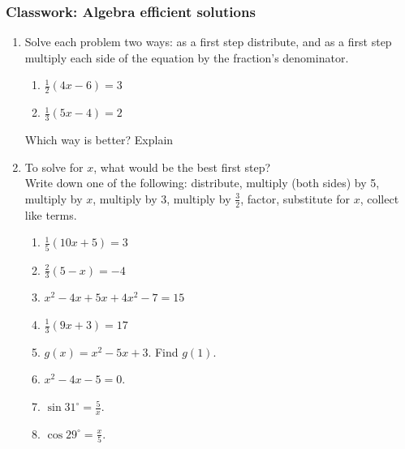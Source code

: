 \documentclass[12pt, twoside]{article}
\begin{document}
\begin{enumerate}
\end{enumerate}

\newpage

\subsubsection*{Classwork: Algebra efficient solutions}
\begin{enumerate}
  \item Solve each problem two ways: as a first step distribute, and as a first step multiply each side of the equation by the fraction's denominator. \vspace{0.5cm}
  \begin{multicols}{2}
    \raggedcolumns
    \begin{enumerate}
  \item   $\frac{1}{2}(4x-6)=3$ \vspace{2.5cm}
  \item   $\frac{1}{3}(5x-4)=2$ \vspace{2.5cm}
  \end{enumerate}

  \end{multicols}
  \vspace{13cm}
Which way is better? Explain
\newpage

\item To solve for $x$, what would be the best first step? \\[0.5cm]
Write down one of the following: distribute, multiply (both sides) by 5, multiply by $x$, multiply by 3, multiply by $\frac{3}{2}$, factor, substitute for $x$, collect like terms. \vspace{0.5cm}
\begin{multicols}{2}
  \raggedcolumns
  \begin{enumerate}
\item   $\frac{1}{5}(10x+5)=3$ \vspace{0.5cm}
\item   $\frac{2}{3}(5-x)=-4$ \vspace{0.5cm}
\item $x^2-4x+5x+4x^2-7=15$ \vspace{0.5cm}
\item $\frac{1}{3}(9x+3)=17$ \vspace{0.5cm}
\item $g(x)=x^2-5x+3$. Find $g(1)$. \vspace{0.5cm}
\item $x^2-4x-5=0$. \vspace{0.5cm}
\item $\displaystyle \sin 31^\circ = \frac{5}{x}$. \vspace{0.5cm}
\item $\displaystyle \cos 29^\circ = \frac{x}{5}$. \vspace{0.5cm}



\end{enumerate}
\end{multicols}
\end{enumerate}
\end{document}
